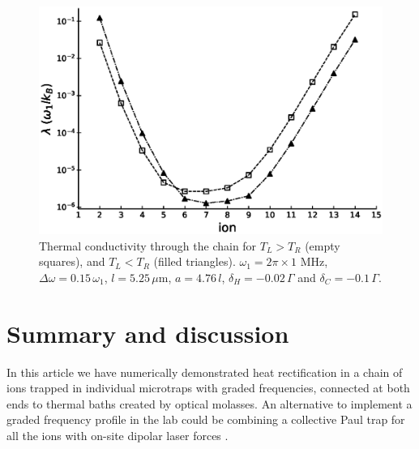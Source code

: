 \begin{figure}[t]
    \includegraphics[width=\linewidth]{Figures/fig_lambda_centered.eps}
    \caption{Thermal conductivity through the chain for $T_L > T_R$ (empty squares), and $T_L < T_R$ (filled triangles). $\omega_1 = 2 \pi \times 1$ MHz, $\Delta \omega = 0.15 \, \omega_1$, $l = 5.25\,\mu$m, $a = 4.76 \, l$, $\delta_H = -0.02 \,\Gamma$ and $\delta_C = -0.1 \, \Gamma$.}
    \label{fig:Thermal_conductivity}
\end{figure}
%
%
\section{Summary and discussion\label{ConclusionsChapter1}}
%
%
%
%
In this article we have numerically demonstrated heat rectification in a chain of ions trapped in individual microtraps with graded frequencies, connected at both ends to thermal baths
created by optical molasses. An alternative to implement a graded
frequency profile in the lab
could be combining a collective Paul trap for all the ions with on-site dipolar laser forces \cite{Freitas2015,Enderlein2012,Bermudez2013,Schneider2010}.

